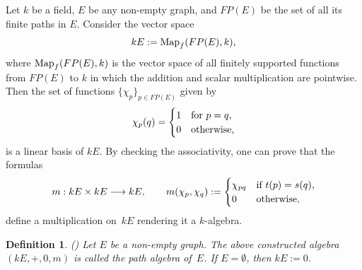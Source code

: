 \documentclass[12pt,times,a4paper]{amsart}
\def\0D{\Delta^{(0)}}
\newcommand{\longto}{\longrightarrow}
\newtheorem{definition}[theorem]{Definition}
\numberwithin{equation}{section}
\def\text{\hbox}
\numberwithin{equation}{section}
\begin{document}
Let $k$ be a field, $E$ be any non-empty graph, and $FP(E)$ be the set of all its finite paths in $E$. Consider the vector space
\begin{equation}
kE:={\rm Map}_f(FP(E),k),
\end{equation}
where ${\rm Map}_f(FP(E),k)$ is the vector space of all finitely supported functions from $FP(E)$ to $k$ in which the addition and scalar multiplication are 
pointwise. Then the set of functions $\{\chi_p\}_{p\in FP(E)}$ given by
\begin{equation}
\chi_p(q)=\begin{cases}1 &\text{for }p=q,\\0 & \text{otherwise},\end{cases}
\end{equation}
is a linear basis of $kE$. 
By checking the associativity, one can prove that the formulas
\begin{equation}
m:kE\times kE\longto kE,\qquad m(\chi_p,\chi_q):=\begin{cases}\chi_{pq} & \text{if }t(p)=s(q),\\0 & \text{otherwise},\end{cases}
\end{equation}
define a multiplication on~$kE$ rendering it a $k$-algebra. 
\begin{definition}{{\rm (\cite[Definition~II.1.2]{ass06})}}
Let $E$ be a non-empty graph. 
The above constructed algebra $(kE,+,0,m)$ is called the {\em path algebra} of~$E$.
If $E=\emptyset$, then $kE:=0$.
\end{definition}
\end{document}
